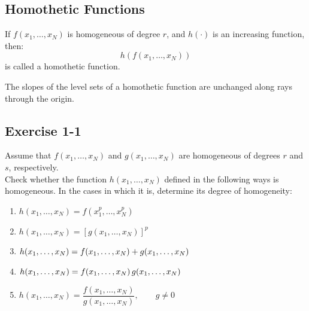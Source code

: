 \subsection*{Homothetic Functions}

If $f(x_1, \dots, x_N)$ is homogeneous of degree $r$, and $h(\cdot)$ is an increasing function, then:
\[
h(f(x_1, \dots, x_N))
\]
is called a homothetic function.

The slopes of the level sets of a homothetic function are unchanged along rays through the origin.


\begin{tcolorbox}[breakable]
\subsection*{Exercise 1-1}

Assume that $f(x_1, \dots, x_N)$ and $g(x_1, \dots, x_N)$ are homogeneous
of degrees $r$ and $s$, respectively. \\Check whether the function
$h(x_1, \dots, x_N)$ defined in the following ways is homogeneous.
In the cases in which it is, determine its degree of homogeneity:

\begin{enumerate}
    \item[(i)] $h(x_1, \dots, x_N) = f(x_1^p, \dots, x_N^p)$
    \item[(ii)] $h(x_1, \dots, x_N) = [g(x_1, \dots, x_N)]^p$
    \item[(iii)] $h(x_1, \dots, x_N) \\= f(x_1, \dots, x_N) + g(x_1, \dots, x_N)$
    \item[(iv)] $h(x_1, \dots, x_N) \\= f(x_1, \dots, x_N)\, g(x_1, \dots, x_N)$
    \item[(v)] $h(x_1, \dots, x_N) = \dfrac{f(x_1, \dots, x_N)}{g(x_1, \dots, x_N)}, \qquad g \neq 0$
\end{enumerate}

\end{tcolorbox}

